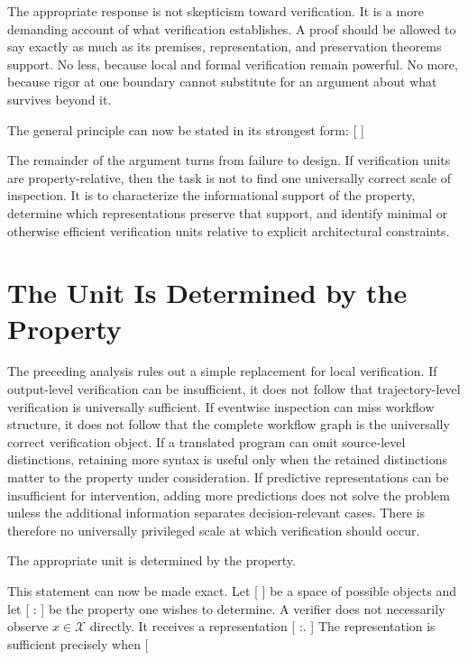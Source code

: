 \documentclass[11pt]{article}
\begin{document}
The appropriate response is not skepticism toward verification. It is a more demanding account of what verification establishes. A proof should be allowed to say exactly as much as its premises, representation, and preservation theorems support. No less, because local and formal verification remain powerful. No more, because rigor at one boundary cannot substitute for an argument about what survives beyond it.

The general principle can now be stated in its strongest form:
[
]

The remainder of the argument turns from failure to design. If verification units are property-relative, then the task is not to find one universally correct scale of inspection. It is to characterize the informational support of the property, determine which representations preserve that support, and identify minimal or otherwise efficient verification units relative to explicit architectural constraints.

\section{The Unit Is Determined by the Property}

The preceding analysis rules out a simple replacement for local verification. If output-level verification can be insufficient, it does not follow that trajectory-level verification is universally sufficient. If eventwise inspection can miss workflow structure, it does not follow that the complete workflow graph is the universally correct verification object. If a translated program can omit source-level distinctions, retaining more syntax is useful only when the retained distinctions matter to the property under consideration. If predictive representations can be insufficient for intervention, adding more predictions does not solve the problem unless the additional information separates decision-relevant cases. There is therefore no universally privileged scale at which verification should occur.

The appropriate unit is determined by the property.

This statement can now be made exact. Let
[
]
be a space of possible objects and let
[
\Phi:\rightarrow{}
]
be the property one wishes to determine. A verifier does not necessarily observe $x\in\mathcal{X}$ directly. It receives a representation
[
\pi:\rightarrow{}.
]
The representation is sufficient precisely when
[
\Phi
\end{document}
